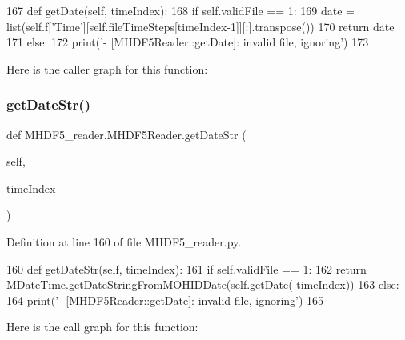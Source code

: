 \begin{DoxyCode}
167     \textcolor{keyword}{def }getDate(self, timeIndex):
168         \textcolor{keywordflow}{if} self.validFile == 1:
169             date = list(self.f[\textcolor{stringliteral}{'Time'}][self.fileTimeSteps[timeIndex-1]][:].transpose())
170             \textcolor{keywordflow}{return} date
171         \textcolor{keywordflow}{else}:
172             print(\textcolor{stringliteral}{'- [MHDF5Reader::getDate]: invalid file, ignoring'})
173                 
\end{DoxyCode}
Here is the caller graph for this function\+:
\mbox{\label{class_m_h_d_f5__reader_1_1_m_h_d_f5_reader_a81ca43bbc8a077b4daf07e07bba3e31d}} 
\subsubsection{\texorpdfstring{get\+Date\+Str()}{getDateStr()}}
{\footnotesize\ttfamily def M\+H\+D\+F5\+\_\+reader.\+M\+H\+D\+F5\+Reader.\+get\+Date\+Str (\begin{DoxyParamCaption}\item[{}]{self,  }\item[{}]{time\+Index }\end{DoxyParamCaption})}



Definition at line 160 of file M\+H\+D\+F5\+\_\+reader.\+py.


\begin{DoxyCode}
160     \textcolor{keyword}{def }getDateStr(self, timeIndex):
161         \textcolor{keywordflow}{if} self.validFile == 1:            
162             \textcolor{keywordflow}{return} \mbox{\hyperlink{namespace_m_date_time_a57cf43e4864af605636039c5a06672c8}{MDateTime.getDateStringFromMOHIDDate}}(self.getDate(
      timeIndex))
163         \textcolor{keywordflow}{else}:
164             print(\textcolor{stringliteral}{'- [MHDF5Reader::getDate]: invalid file, ignoring'})
165             
\end{DoxyCode}
Here is the call graph for this function\+:
\mbox{\label{class_m_h_d_f5__reader_1_1_m_h_d_f5_reader_af878d42810452ebceffe648bd04970d1}} 
